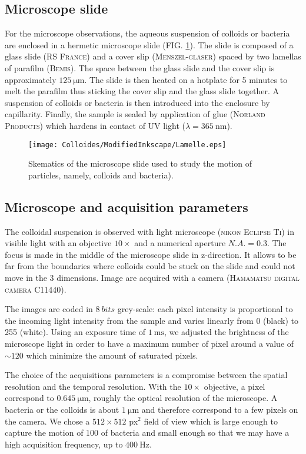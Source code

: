 \documentclass[%
 aip,
 jmp,%
 amsmath,amssymb,
reprint,%
]{revtex4-1}
\begin{document}
\subsection{Microscope slide}
For the microscope observations, the aqueous suspension of colloids or bacteria are enclosed in a hermetic microscope slide (FIG. \ref{Slide}). The  slide is composed of a  glass slide (\textsc{RS France}) and a cover slip (\textsc{Menszel-gl\"aser}) spaced by two lamellas of parafilm (\textsc{Bemis}).  The space between the glass slide and the cover slip is approximately $\SI{125}{\micro\meter}$.  The slide is then heated on a hotplate for 5 minutes to melt the parafilm thus sticking the cover slip and the glass slide together. A suspension of colloids or bacteria is then introduced into the enclosure by capillarity. Finally, the sample is sealed by application of glue (\textsc{Norland Products}) which hardens in contact of UV light ($\lambda = \SI{365}{\nano\meter}$).


\begin{figure}
\texttt{[image: Colloides/ModifiedInkscape/Lamelle.eps]}
\caption{Skematics of the microscope slide used to study the motion of particles, namely, colloids and bacteria).}
\label{Slide}
\end{figure}

\subsection{Microscope and acquisition parameters}

The colloidal suspension is observed with light microscope (\textsc{nikon Eclipse Ti}) in visible light with an objective $10 \times$ and a numerical aperture $N.A. = 0.3$. The focus is made in the middle of the microscope slide in z-direction. It allows to be far from the boundaries where colloids could be stuck on the slide and could not move in the 3 dimensions. Image are acquired with a camera (\textsc{Hamamatsu digital camera C11440}).

The images are coded in $\SI{8}{bits}$  grey-scale: each pixel intensity is proportional to the incoming light intensity from the sample and varies linearly from  0 (black) to 255 (white). Using an exposure time of $\SI{1}{\milli\second}$, we adjusted the brightness of the microscope light in order to have a maximum number of pixel around a value of $\sim 120$ which minimize the amount of saturated pixels.

The choice of the acquisitions parameters is a compromise between the spatial resolution and the temporal resolution. With the $10\times$ objective, a pixel correspond to $\SI{0.645}{\micro\meter}$, roughly the optical resolution of the microscope. A bacteria or the colloids is about $\SI{1}{\micro\meter}$ and therefore correspond to a few pixels on the camera. We chose a $512 \times 512$ px$^2$ field of view which is large enough to capture the motion of 100 of bacteria and small enough so that we may have a high acquisition frequency, up to $\SI{400}{\hertz}$.
\end{document}
